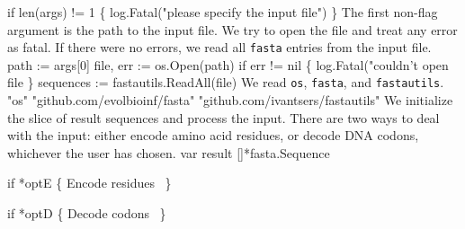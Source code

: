 if len(args) != 1 \{
          log.Fatal("please specify the input file")
\}
\nwendcode{}\nwdocspar
The first non-flag argument is the path to the input file. We try to
open the file and treat any error as fatal. If there were no errors,
we read all \texttt{fasta} entries from the input file.
\nwenddocs{}\endmoddef\nwstartdeflinemarkup{}\nwenddeflinemarkup
path := args[0]
file, err := os.Open(path)
if err != nil \{
          log.Fatal("couldn't open file %
\}
sequences := fastautils.ReadAll(file)
\nwendcode{}\nwdocspar
We read \texttt{os}, \texttt{fasta}, and \texttt{fastautils}.
\nwenddocs{}\plusendmoddef\nwstartdeflinemarkup{}\nwenddeflinemarkup
"os"
"github.com/evolbioinf/fasta"
"github.com/ivantsers/fastautils"
\nwendcode{}\nwdocspar
We initialize the slice of result sequences and process the
input. There are two ways to deal with the input: either encode amino
acid residues, or decode DNA codons, whichever the user has chosen.
\nwenddocs{}\endmoddef\nwstartdeflinemarkup{}\nwenddeflinemarkup
var result []*fasta.Sequence

if *optE \{
          \LA{}Encode residues~{\nwtagstyle{}}\RA{}
\}

if *optD \{
          \LA{}Decode codons~{\nwtagstyle{}}\RA{}
\}
\nwendcode{}\nwdocspar
